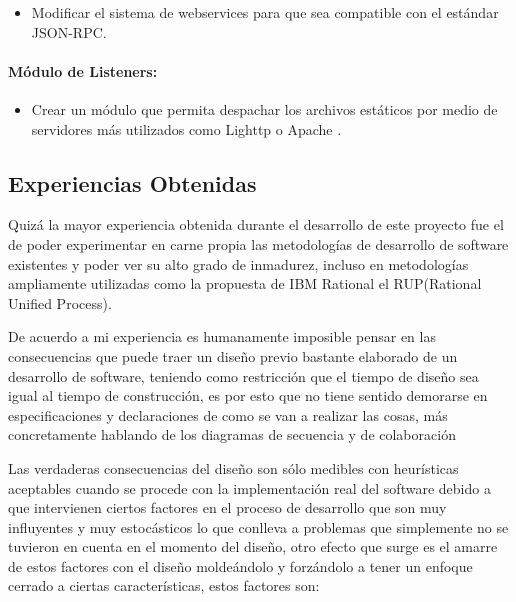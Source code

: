 \begin{itemize}
	\item Modificar el sistema de webservices para que sea compatible con el estándar JSON-RPC. \cite{json-rpc}
\end{itemize}

\paragraph{Módulo de Listeners:}

\begin{itemize}
	\item Crear un módulo que permita despachar los archivos estáticos por medio de servidores más utilizados como Lighttp \cite{lighttp} o Apache \cite{apache}.
\end{itemize}


\subsection{Experiencias Obtenidas}

Quizá la mayor experiencia obtenida durante el desarrollo de este proyecto fue el de poder experimentar en carne propia las metodologías de desarrollo de software existentes y poder ver su alto grado de inmadurez, incluso en metodologías ampliamente utilizadas como la propuesta de IBM Rational el RUP(Rational Unified Process).

De acuerdo a mi experiencia es humanamente imposible pensar en las consecuencias que puede traer un diseño previo bastante elaborado de un desarrollo de software, teniendo como restricción que el tiempo de diseño sea igual al tiempo de construcción, es por esto que no tiene sentido demorarse en especificaciones y declaraciones de como se van a realizar las cosas, más concretamente hablando de los diagramas de secuencia y de colaboración

Las verdaderas consecuencias del diseño son sólo medibles con heurísticas aceptables cuando se procede con la implementación real del software debido a que intervienen ciertos factores en el proceso de desarrollo que son muy influyentes y muy estocásticos lo que conlleva a problemas que simplemente no se tuvieron en cuenta en el momento del diseño, otro efecto que surge es el amarre de estos factores con el diseño moldeándolo y forzándolo a tener un enfoque cerrado a ciertas características, estos factores son:

